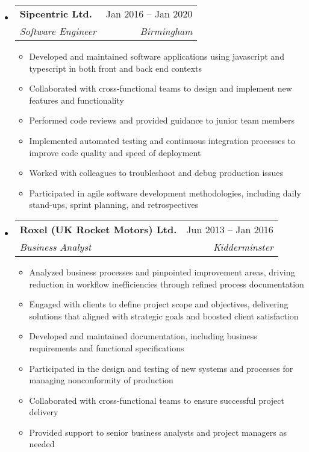 \documentclass[a4paper,12pt]{article}[leftmargin=*]
\makeatletter
\def \entryspacing {-0pt}
\renewcommand{\section}[2]{\vspace{5pt}
  \colorbox{secondary}{\color{white}\raggedbottom\normalsize\textbf{{#1}{\hspace{7pt}#2}}}
}
\newcommand{\resumeEntryStart}{\begin{itemize}[leftmargin=2.5mm]}
\newcommand{\resumeEntryEnd}{\end{itemize}\vspace{\entryspacing}}
\newcommand{\resumeItemListStart}{\begin{itemize}[leftmargin=4.5mm]}
\newcommand{\resumeItemListEnd}{\end{itemize}}
\newcommand{\resumeItem}[1]{
  \item\small{
    {#1 \vspace{-2pt}}
  }
}
\newcommand{\resumeEntryTSDL}[4]{
  \vspace{-1pt}\item[]
    \begin{tabularx}{0.97\textwidth}{X@{\hspace{60pt}}r}
      \textbf{\color{primary}#1} & {\firabook\color{accent}\small#2} \\
      \textit{\color{accent}\small#3} & \textit{\color{accent}\small#4} \\
    \end{tabularx}\vspace{-6pt}
}
\newcommand{\resumeEntryS}[2]{
  \item[]\small{
    \textbf{\color{primary}#1 }{ #2 \vspace{-6pt}}
  }
}
\makeatother
\begin{document}
  \resumeEntryStart
    \resumeEntryTSDL
      {Sipcentric Ltd.}{Jan 2016 -- Jan 2020}
      {Software Engineer}{Birmingham}
    \resumeItemListStart
      \resumeItem {Developed and maintained software applications using javascript and typescript in both front and back end contexts}
      \resumeItem {Collaborated with cross-functional teams to design and implement new features and functionality}
      \resumeItem {Performed code reviews and provided guidance to junior team members}
      \resumeItem {Implemented automated testing and continuous integration processes to improve code quality and speed of deployment}
      \resumeItem {Worked with colleagues to troubleshoot and debug production issues}
      \resumeItem {Participated in agile software development methodologies, including daily stand-ups, sprint planning, and retrospectives}
    \resumeItemListEnd
  \resumeEntryEnd

  \resumeEntryStart
    \resumeEntryTSDL
      {Roxel (UK Rocket Motors) Ltd.}{Jun 2013 -- Jan 2016}
      {Business Analyst}{Kidderminster}
    \resumeItemListStart
        \resumeItem {Analyzed business processes and pinpointed improvement areas, driving reduction in workflow inefficiencies through refined process documentation}
        \resumeItem {Engaged with clients to define project scope and objectives, delivering solutions that aligned with strategic goals and boosted client satisfaction}
        \resumeItem {Developed and maintained documentation, including business requirements and functional specifications}
        \resumeItem {Participated in the design and testing of new systems and processes for managing nonconformity of production}
        \resumeItem {Collaborated with cross-functional teams to ensure successful project delivery}
        \resumeItem {Provided support to senior business analysts and project managers as needed}
    \resumeItemListEnd
  \resumeEntryEnd

\end{document}
